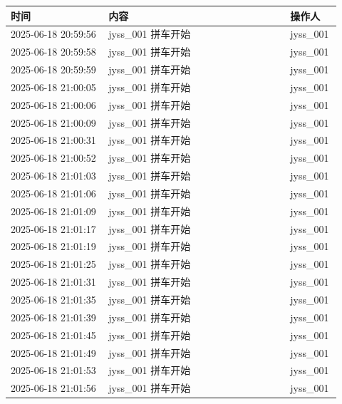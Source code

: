 \documentclass[UTF8,10pt,a4paper,fontset=fandol]{ctexart}
\begin{document}
\begin{center}
\small
\begin{tabular}{|p{0.28\linewidth}|p{0.52\linewidth}|p{0.12\linewidth}|}
\hline
时间 & 内容 & 操作人 \\
\hline
2025-06-18 20:59:56 & jyss\_001 拼车开始 & jyss\_001 \\
\hline
2025-06-18 20:59:58 & jyss\_001 拼车开始 & jyss\_001 \\
\hline
2025-06-18 20:59:59 & jyss\_001 拼车开始 & jyss\_001 \\
\hline
2025-06-18 21:00:05 & jyss\_001 拼车开始 & jyss\_001 \\
\hline
2025-06-18 21:00:06 & jyss\_001 拼车开始 & jyss\_001 \\
\hline
2025-06-18 21:00:09 & jyss\_001 拼车开始 & jyss\_001 \\
\hline
2025-06-18 21:00:31 & jyss\_001 拼车开始 & jyss\_001 \\
\hline
2025-06-18 21:00:52 & jyss\_001 拼车开始 & jyss\_001 \\
\hline
2025-06-18 21:01:03 & jyss\_001 拼车开始 & jyss\_001 \\
\hline
2025-06-18 21:01:06 & jyss\_001 拼车开始 & jyss\_001 \\
\hline
2025-06-18 21:01:09 & jyss\_001 拼车开始 & jyss\_001 \\
\hline
2025-06-18 21:01:17 & jyss\_001 拼车开始 & jyss\_001 \\
\hline
2025-06-18 21:01:19 & jyss\_001 拼车开始 & jyss\_001 \\
\hline
2025-06-18 21:01:25 & jyss\_001 拼车开始 & jyss\_001 \\
\hline
2025-06-18 21:01:31 & jyss\_001 拼车开始 & jyss\_001 \\
\hline
2025-06-18 21:01:35 & jyss\_001 拼车开始 & jyss\_001 \\
\hline
2025-06-18 21:01:39 & jyss\_001 拼车开始 & jyss\_001 \\
\hline
2025-06-18 21:01:45 & jyss\_001 拼车开始 & jyss\_001 \\
\hline
2025-06-18 21:01:49 & jyss\_001 拼车开始 & jyss\_001 \\
\hline
2025-06-18 21:01:53 & jyss\_001 拼车开始 & jyss\_001 \\
\hline
2025-06-18 21:01:56 & jyss\_001 拼车开始 & jyss\_001 \\
\hline
\end{tabular}
\end{center}

\end{document}
